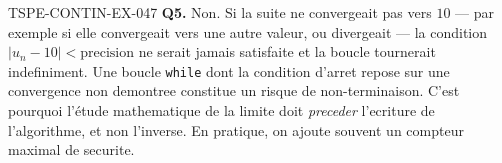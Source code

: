 \begin{corrige}{TSPE-CONTIN-EX-047}
\textbf{Q5.} Non. Si la suite ne convergeait pas vers $10$ — par exemple si elle convergeait vers une autre valeur, ou divergeait — la condition $\left|u_n - 10\right| < \text{precision}$ ne serait jamais satisfaite et la boucle tournerait indefiniment. Une boucle \verb|while| dont la condition d'arret repose sur une convergence non demontree constitue un risque de non-terminaison. C'est pourquoi l'étude mathematique de la limite doit \emph{preceder} l'ecriture de l'algorithme, et non l'inverse. En pratique, on ajoute souvent un compteur maximal de securite.
\end{corrige}

